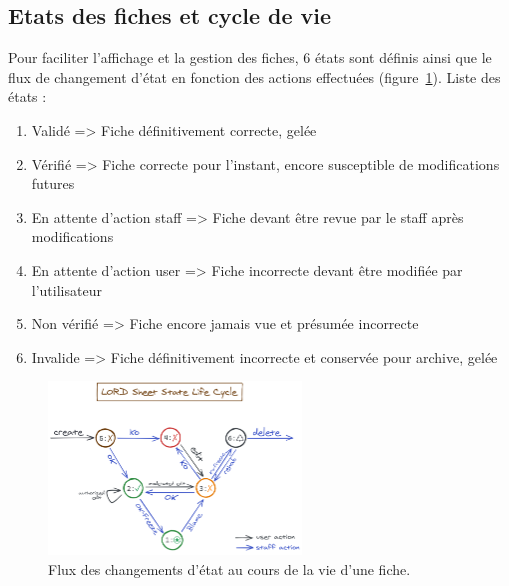 ﻿\documentclass[a4paper,10pt]{article}
\begin{document}
\subsection{Etats des fiches et cycle de vie}
Pour faciliter l'affichage et la gestion des fiches, 6 états sont définis ainsi que le flux de changement d'état en fonction des actions effectuées (figure~\ref{fig:lifecycle}).
Liste des états :
\begin{enumerate}
\item Validé => Fiche définitivement correcte, gelée
\item Vérifié => Fiche correcte pour l'instant, encore susceptible de modifications futures
\item En attente d'action staff => Fiche devant être revue par le staff après modifications
\item En attente d'action user => Fiche incorrecte devant être modifiée par l'utilisateur
\item Non vérifié => Fiche encore jamais vue et présumée incorrecte
\item Invalide => Fiche définitivement incorrecte et conservée pour archive, gelée
\end{enumerate}

\begin{figure}
\begin{center}
\includegraphics[width=0.6\textwidth]{SheetLifecycle.png}
\end{center}
\caption{Flux des changements d'état au cours de la vie d'une fiche.\label{fig:lifecycle}}
\end{figure}
\end{document}

